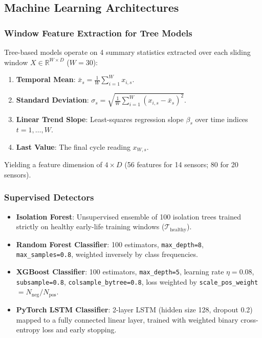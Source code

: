 \subsection{Machine Learning Architectures}

\subsubsection{Window Feature Extraction for Tree Models}
Tree-based models operate on 4 summary statistics extracted over each sliding window $X \in \mathbb{R}^{W \times D}$ ($W=30$):
\begin{enumerate}
    \item \textbf{Temporal Mean}: $\bar{x}_s = \frac{1}{W} \sum_{i=1}^W x_{i, s}$.
    \item \textbf{Standard Deviation}: $\sigma_s = \sqrt{\frac{1}{W} \sum_{i=1}^W (x_{i, s} - \bar{x}_s)^2}$.
    \item \textbf{Linear Trend Slope}: Least-squares regression slope $\beta_s$ over time indices $t = 1, \dots, W$.
    \item \textbf{Last Value}: The final cycle reading $x_{W, s}$.
\end{enumerate}
Yielding a feature dimension of $4 \times D$ (56 features for 14 sensors; 80 for 20 sensors).

\subsubsection{Supervised Detectors}
\begin{itemize}
    \item \textbf{Isolation Forest}: Unsupervised ensemble of 100 isolation trees trained strictly on healthy early-life training windows ($\mathcal{T}_{\text{healthy}}$).
    \item \textbf{Random Forest Classifier}: 100 estimators, \texttt{max\_depth=8}, \texttt{max\_samples=0.8}, weighted inversely by class frequencies.
    \item \textbf{XGBoost Classifier}: 100 estimators, \texttt{max\_depth=5}, learning rate $\eta=0.08$, \texttt{subsample=0.8}, \texttt{colsample\_bytree=0.8}, loss weighted by \texttt{scale\_pos\_weight} $= N_{\text{neg}} / N_{\text{pos}}$.
    \item \textbf{PyTorch LSTM Classifier}: 2-layer LSTM (hidden size 128, dropout 0.2) mapped to a fully connected linear layer, trained with weighted binary cross-entropy loss and early stopping.
\end{itemize}

